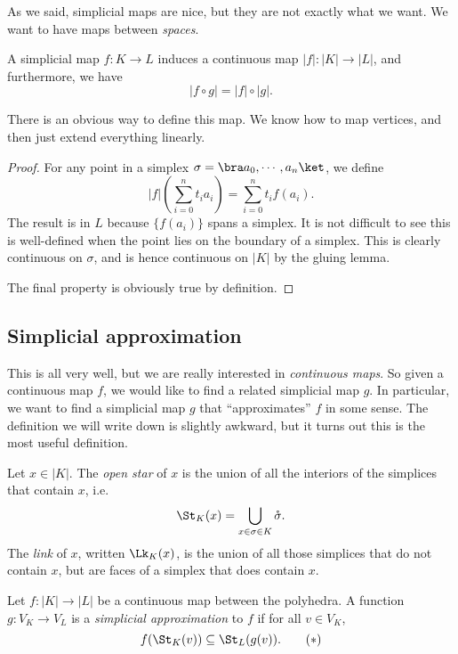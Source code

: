 \documentclass[a4paper]{article}
\begin{document}
As we said, simplicial maps are nice, but they are not exactly what we want. We want to have maps between \emph{spaces}.
\begin{lemma}
  A simplicial map $f: K \to L$ induces a continuous map $|f|: |K|\to |L|$, and furthermore, we have
  \[
    |f\circ g| = |f|\circ |g|.
  \]
\end{lemma}
There is an obvious way to define this map. We know how to map vertices, and then just extend everything linearly.
\begin{proof}
  For any point in a simplex $\sigma = \bra a_0,\cdots, a_n\ket$, we define
  \[
    |f|\left(\sum_{i = 0}^n t_i a_i\right) = \sum_{i = 0}^n t_i f(a_i).
  \]
  The result is in $L$ because $\{f(a_i)\}$ spans a simplex. It is not difficult to see this is well-defined when the point lies on the boundary of a simplex. This is clearly continuous on $\sigma$, and is hence continuous on $|K|$ by the gluing lemma.

  The final property is obviously true by definition.
\end{proof}

\subsection{Simplicial approximation}
This is all very well, but we are really interested in \emph{continuous maps}. So given a continuous map $f$, we would like to find a related simplicial map $g$. In particular, we want to find a simplicial map $g$ that ``approximates'' $f$ in some sense. The definition we will write down is slightly awkward, but it turns out this is the most useful definition.

\begin{defi}
  Let $x \in |K|$. The \emph{open star} of $x$ is the union of all the interiors of the simplices that contain $x$, i.e.
  \[
    \St_K(x) = \bigcup_{x \in \sigma \in K} \mathring{\sigma}.
  \]
  The \emph{link} of $x$, written $\Lk_K(x)$, is the union of all those simplices that do not contain $x$, but are faces of a simplex that does contain $x$.
\end{defi}

\begin{defi}
  Let $f: |K| \to |L|$ be a continuous map between the polyhedra. A function $g: V_K \to V_L$ is a \emph{simplicial approximation} to $f$ if for all $v \in V_K$,
  \[
    f(\St_K(v)) \subseteq \St_L(g(v)).\tag{$*$}
  \]
\end{defi}
\end{document}
